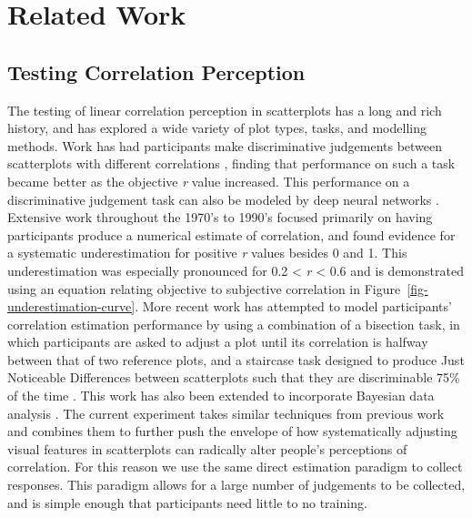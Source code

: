 \documentclass[manuscript, anonymous, screen]{acmart}
\begin{document}
\hypertarget{sec-related-work}{%
\section{Related Work}\label{sec-related-work}}

\hypertarget{sec-testing-corr-percept}{%
\subsection{Testing Correlation
Perception}\label{sec-testing-corr-percept}}

The testing of linear correlation perception in scatterplots has a long
and rich history, and has explored a wide variety of plot types, tasks,
and modelling methods. Work has had participants make discriminative
judgements between scatterplots with different correlations
\citep{pollack_1960, doherty_2007}, finding that performance on such a
task became better as the objective \emph{r} value increased. This
performance on a discriminative judgement task can also be modeled by
deep neural networks \citep{yang_2023}. Extensive work throughout the
1970's to 1990's focused primarily on having participants produce a
numerical estimate of correlation, and found evidence for a systematic
underestimation for positive \emph{r} values besides 0 and 1. This
underestimation was especially pronounced for 0.2 \textless{} \emph{r}
\textless{} 0.6
\citep{strahan_1978, bobko_1979, cleveland_1982, lane_1985, lauer_1989, collyer_1990, meyer_1992}
and is demonstrated using an equation relating objective to subjective
correlation \citep{rensink_2017} in
Figure~\ref{fig-underestimation-curve}. More recent work has attempted
to model participants' correlation estimation performance by using a
combination of a bisection task, in which participants are asked to
adjust a plot until its correlation is halfway between that of two
reference plots, and a staircase task designed to produce Just
Noticeable Differences between scatterplots such that they are
discriminable 75\% of the time \citep{rensink_2010}. This work has also
been extended to incorporate Bayesian data analysis \citep{kay_2015}.
The current experiment takes similar techniques from previous work
\citep{strain_2023, strain_2023b} and combines them to further push the
envelope of how systematically adjusting visual features in scatterplots
can radically alter people's perceptions of correlation. For this reason
we use the same direct estimation paradigm to collect responses. This
paradigm allows for a large number of judgements to be collected, and is
simple enough that participants need little to no training.
\end{document}
